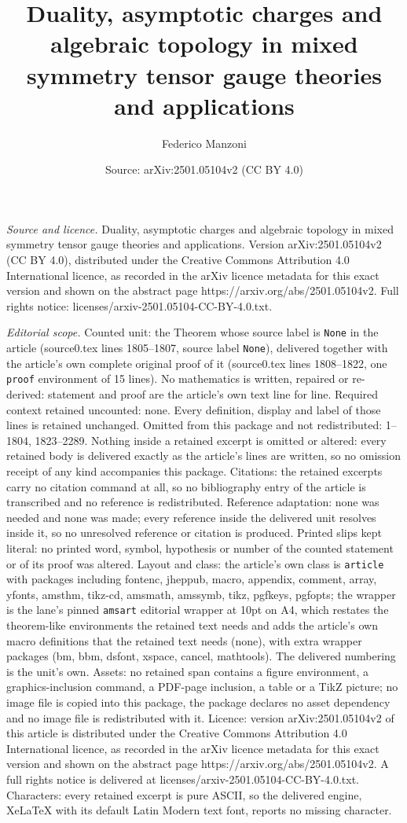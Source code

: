 \documentclass[10pt,a4paper]{amsart}
\title[Duality, asymptotic charges and algebraic topology in mixed ]{Duality, asymptotic charges and algebraic topology in mixed symmetry tensor gauge theories and applications}
\author{Federico Manzoni}
\date{Source: arXiv:2501.05104v2 (CC BY 4.0)}
\begin{document}
\maketitle

\noindent\emph{Source and licence.} Duality, asymptotic charges and algebraic topology in mixed symmetry tensor gauge theories and applications. Version arXiv:2501.05104v2 (CC BY 4.0), distributed under the Creative Commons Attribution 4.0 International licence, as recorded in the arXiv licence metadata for this exact version and shown on the abstract page https://arxiv.org/abs/2501.05104v2. Full rights notice: licenses/arxiv-2501.05104-CC-BY-4.0.txt.\par\smallskip

\noindent\textit{Editorial scope.} Counted unit: the Theorem whose source label is \texttt{None} in the article (source0.tex lines 1805--1807, source label \texttt{None}), delivered together with the article's own complete original proof of it (source0.tex lines 1808--1822, one \texttt{proof} environment of 15 lines). No mathematics is written, repaired or re-derived: statement and proof are the article's own text line for line. Required context retained uncounted: none. Every definition, display and label of those lines is retained unchanged. Omitted from this package and not redistributed: 1--1804, 1823--2289. Nothing inside a retained excerpt is omitted or altered: every retained body is delivered exactly as the article's lines are written, so no omission receipt of any kind accompanies this package. Citations: the retained excerpts carry no citation command at all, so no bibliography entry of the article is transcribed and no reference is redistributed. Reference adaptation: none was needed and none was made; every reference inside the delivered unit resolves inside it, so no unresolved reference or citation is produced. Printed slips kept literal: no printed word, symbol, hypothesis or number of the counted statement or of its proof was altered. Layout and class: the article's own class is \texttt{article} with packages including fontenc, jheppub, macro, appendix, comment, array, yfonts, amsthm, tikz-cd, amsmath, amssymb, tikz, pgfkeys, pgfopts; the wrapper is the lane's pinned \texttt{amsart} editorial wrapper at 10pt on A4, which restates the theorem-like environments the retained text needs and adds the article's own macro definitions that the retained text needs (none), with extra wrapper packages (bm, bbm, dsfont, xspace, cancel, mathtools). The delivered numbering is the unit's own. Assets: no retained span contains a figure environment, a graphics-inclusion command, a PDF-page inclusion, a table or a TikZ picture; no image file is copied into this package, the package declares no asset dependency and no image file is redistributed with it. Licence: version arXiv:2501.05104v2 of this article is distributed under the Creative Commons Attribution 4.0 International licence, as recorded in the arXiv licence metadata for this exact version and shown on the abstract page https://arxiv.org/abs/2501.05104v2. A full rights notice is delivered at licenses/arxiv-2501.05104-CC-BY-4.0.txt. Characters: every retained excerpt is pure ASCII, so the delivered engine, XeLaTeX with its default Latin Modern text font, reports no missing character.
\end{document}
